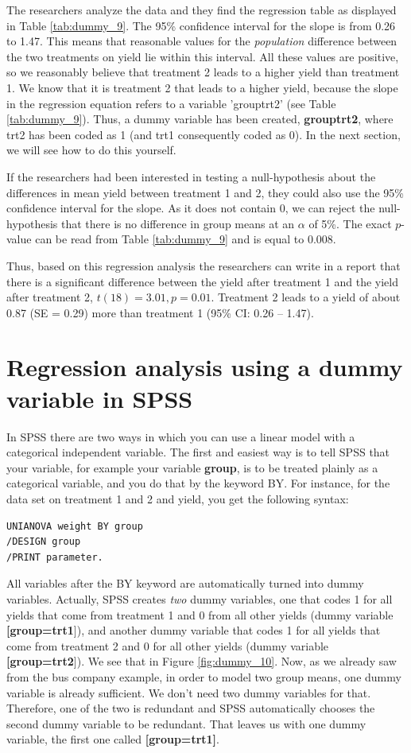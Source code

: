 \documentclass[]{book}\usepackage[]{graphicx}\usepackage[]{color}
\begin{document}
The researchers analyze the data and they find the regression table as displayed in Table \ref{tab:dummy_9}. The 95\% confidence interval for the slope is from 0.26 to 1.47. This means that reasonable values for the \textit{population} difference between the two treatments on yield lie within this interval. All these values are positive, so we reasonably believe that treatment 2 leads to a higher yield than treatment 1. We know that it is treatment 2 that leads to a higher yield, because the slope in the regression equation refers to a variable 'grouptrt2' (see Table \ref{tab:dummy_9}). Thus, a dummy variable has been created, \textbf{grouptrt2}, where trt2 has been coded as 1 (and trt1 consequently coded as 0). In the next section, we will see how to do this yourself.

If the researchers had been interested in testing a null-hypothesis about the differences in mean yield between treatment 1 and 2, they could also use the 95\% confidence interval for the slope. As it does not contain 0, we can reject the null-hypothesis that there is no difference in group means at an $\alpha$ of 5\%. The exact $p$-value can be read from Table \ref{tab:dummy_9} and is equal to 0.008.

Thus, based on this regression analysis the researchers can write in a report that there is a significant difference between the yield after treatment 1 and the yield after treatment 2, $t(18) = 3.01, p=0.01$. Treatment 2 leads to a yield of about 0.87 (SE = 0.29) more than treatment 1 (95\% CI: 0.26 -- 1.47).

\section{Regression analysis using a dummy variable in SPSS}

In SPSS there are two ways in which you can use a linear model with a categorical independent variable. The first and easiest way is to tell SPSS that your variable, for example your variable \textbf{group}, is to be treated plainly as a categorical variable, and you do that by the keyword BY. For instance, for the data set on treatment 1 and 2 and yield, you get the following syntax:

\begin{verbatim}
UNIANOVA weight BY group 
/DESIGN group
/PRINT parameter.
\end{verbatim}

All variables after the BY keyword are automatically turned into dummy variables. Actually, SPSS creates \textit{two} dummy variables, one that codes 1 for all yields that come from treatment 1 and 0 from all other yields (dummy variable \textbf{[group=trt1}]), and another dummy variable that codes 1 for all yields that come from treatment 2 and 0 for all other yields (dummy variable \textbf{[group=trt2}]). We see that in Figure \ref{fig:dummy_10}. Now, as we already saw from the bus company example, in order to model two group means, one dummy variable is already sufficient. We don't need two dummy variables for that. Therefore, one of the two is redundant and SPSS automatically chooses the second dummy variable to be redundant. That leaves us with one dummy variable, the first one called \textbf{[group=trt1]}. 
\end{document}

